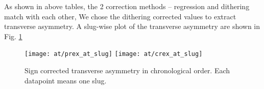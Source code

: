 \begin{comment}
    & 343.4 & 154.8 & 155.1
    & 379.9 & 91.0  & 91.4
    & 493.9 & 93.0  & 94.1
    & 345.4 & 152.9 & 153.0
    & 387.2 & 91.3  & 91.9
    & 495.3 & 93.5  & 95.3
    & 344.5 & 153.7 & 153.9
    & 383.6 & 91.2  & 91.7
    & 494.5 & 93.2  & 94.6


\begin{table}
    \scriptsize
    \begin{tabular}{c | c c c | c c c}
	\hline
	\multirow{2}{*}{Target}	& \multicolumn{3}{c|}{Minirun Average (ppm)} & \multicolumn{3}{c}{Mulplot (ppm)}	\\
	\cline{2-7}
	    & raw	& reg	& dit	& raw	& reg	& dit	\\
	\hline
	\multicolumn{7}{c}{IHWP IN}   \\
	\hline
	C	& 659.82  & 558.10  & 558.71  & 659.84  & 557.97  & 558.56	\\
	Ca40    & 933.96  & 717.96  & 719.28  & 933.69  & 718.04  & 719.32	\\
	Ca48    & 994.35  & 775.30  & 776.19  & 994.78  & 775.61  & 776.50	\\
	Pb	& 1262.78 & 1168.89 & 1170.02 & 1261.95 & 1168.23 & 1169.35	\\
	\hline
	\multicolumn{7}{c}{IHWP OUT}   \\
	\hline
	C	& 8607.92 & 1558.19	& 8789.05 & 1313.51	& 8791.48 & 1314.60	 \\
	Ca40    & 8023.61 & 1751.48	& 7967.37 & 1353.29	& 7994.17 & 1355.00	 \\
	Ca48    & 7267.11 & 1516.31	& 8257.84 & 1180.23	& 8254.72 & 1183.33	 \\
	Pb	& 2089.10 & 2456.43	& 2420.15 & 2263.44	& 2456.87 & 2266.23	 \\
	\hline
	\multicolumn{7}{c}{COMBINED}   \\
	\hline
	C	& 661.92  & 558.72  & 559.27  & 661.73  & 558.75  & 559.29	\\
	Ca40    & 932.99  & 718.38  & 719.52  & 932.93  & 718.36  & 719.47	\\
	Ca48    & 996.46  & 775.93  & 777.46  & 996.67  & 776.15  & 777.63	\\
	Pb	& 1260.29 & 1163.94 & 1165.22 & 1259.54 & 1163.30 & 1164.57	\\
	\hline
    \end{tabular}
    \caption{Mini-wise average and mulplot average values for each target}
\end{table}
\end{comment}
As shown in above tables, the 2 correction methods -- regression and dithering 
match with each other,
We chose the dithering corrected values to extract transverse asymmetry.
A slug-wise plot of the transverse asymmetry are shown in Fig. \ref{fig:AT_slug} 
\begin{figure}[H]
    \centering
    \texttt{[image: at/prex\_at\_slug]}
    \texttt{[image: at/crex\_at\_slug]}
    \caption{Sign corrected transverse asymmetry in chronological order. 
    Each datapoint means one slug.}
    \label{fig:AT_slug}
\end{figure}

